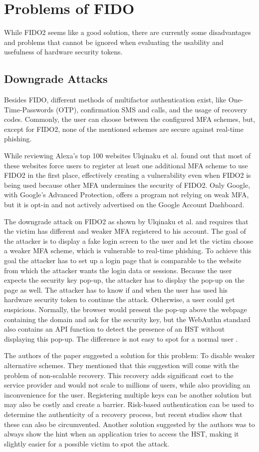 \documentclass[runningheads]{llncs}
\begin{document}
\section{Problems of FIDO}
While FIDO2 seems like a good solution, there are currently some disadvantages and problems that cannot be ignored when evaluating the usability and usefulness of hardware security tokens.

\subsection{Downgrade Attacks}
Besides FIDO, different methods of multifactor authentication exist, like One-Time-Passwords (OTP), confirmation SMS and calls, and the usage of recovery codes. Commonly, the user can choose between the configured MFA schemes, but, except for FIDO2, none of the mentioned schemes are secure against real-time phishing. 

While reviewing Alexa's top 100 websites Ulqinaku et al. found out that most of these websites force users to register at least one additional MFA scheme to use FIDO2 in the first place, effectively creating a vulnerability even when FIDO2 is being used because other MFA undermines the security of FIDO2. Only Google, with Google's Advanced Protection, offers a program not relying on weak MFA, but it is opt-in and not actively advertised on the Google Account Dashboard.

The downgrade attack on FIDO2 as shown by Ulqinaku et al. and requires that the victim has different and weaker MFA registered to his account. The goal of the attacker is to display a fake login screen to the user and let the victim choose a weaker MFA scheme, which is vulnerable to real-time phishing. To achieve this goal the attacker has to set up a login page that is comparable to the website from which the attacker wants the login data or sessions. Because the user expects the security key pop-up, the attacker has to display the pop-up on the page as well. The attacker has to know if and when the user has used his hardware security token to continue the attack. Otherwise, a user could get suspicious. Normally, the browser would present the pop-up above the webpage containing the domain and ask for the security key, but the WebAuthn standard also contains an API function to detect the presence of an HST without displaying this pop-up. The difference is not easy to spot for a normal user \cite{274610}.

The authors of the paper suggested a solution for this problem: To disable weaker alternative schemes. They mentioned that this suggestion will come with the problem of non-scalable recovery. This recovery adds significant cost to the service provider and would not scale to millions of users, while also providing an inconvenience for the user. Registering multiple keys can be another solution but may also be costly and create a barrier. Risk-based authentication can be used to determine the authenticity of a recovery process, but recent studies show that these can also be circumvented. Another solution suggested by the authors was to always show the hint when an application tries to access the HST, making it slightly easier for a possible victim to spot the attack.
\end{document}
